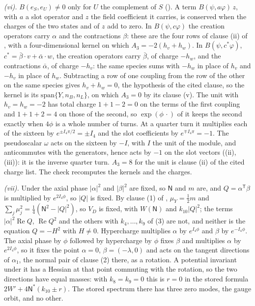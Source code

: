 \emph{(vi).} $B(e_{S}, e_{U}) \neq 0$ only for $U$ the complement of $S$ (). A term $B(\psi, a\varphi)\,z$, with $a$ a slot operator and $z$ the field coefficient it carries, is conserved when the charges of the two states and of $z$ add to zero. In $B(\psi, c\varphi)$ the creation operators carry $\alpha$ and the contractions $\beta$: these are the four rows of clause (ii) of , with a four-dimensional kernel on which $A_{3} = -2(h_{v} + h_{w})$. In $B(\psi, c^{*}\varphi)$, $c^{*} = \bar\beta\cdot v + \bar\alpha\cdot w$, the creation operators carry $\bar\beta$, of charge $-h_{w}$, and the contractions $\bar\alpha$, of charge $-h_{v}$: the same species sums with $-h_{w}$ in place of $h_{v}$ and $-h_{v}$ in place of $h_{w}$. Subtracting a row of one coupling from the row of the other on the same species gives $h_{v} + h_{w} = 0$, the hypothesis of the cited clause, so the kernel is its $\mathrm{span}\{Y, n_{B}, n_{L}\}$, on which $A_{3} = 0$ by its clause (v). The unit with $h_{v} = h_{w} = -2$ has total charge $1 + 1 - 2 = 0$ on the terms of the first coupling and $1 + 1 + 2 = 4$ on those of the second, so $\exp(\phi\,\cdot)$ of it keeps the second exactly when $4\phi$ is a whole number of turns. At a quarter turn it multiplies each of the sixteen by $e^{\pm I_{4}\pi/2} = \pm I_{4}$ and the slot coefficients by $e^{\mp I_{4}\pi} = -1$. The pseudoscalar $\omega$ acts on the sixteen by $-I$, with $I$ the unit of the module, and anticommutes with the generators, hence acts by $-1$ on the slot vectors ((ii), (iii)): it is the inverse quarter turn. $A_{3} = 8$ for the unit is clause (ii) of the cited charge list. The check recomputes the kernels and the charges.

\emph{(vii).} Under the axial phase $|\alpha|^{2}$ and $|\beta|^{2}$ are fixed, so $\mathsf{N}$ and $m$ are, and $Q = \alpha^{\mathsf T}\beta$ is multiplied by $e^{2I_{4}\phi}$, so $|Q|$ is fixed. By clause (1) of , $\mu_{Y} = \tfrac12 m$ and $\sum_{j}\mu_{j}^{2} = \tfrac14(\mathsf{N}^{2} - |Q|^{2})$, so $V_{D}$ is fixed, with $W(\mathsf{N})$ and $k_{10}|Q|^{2}$; the terms $|\alpha|^{2}\operatorname{Re}Q$, $\operatorname{Re}Q^{2}$ and the others with $k_{4}, \dots, k_{9}$ of (3) are not, and neither is the equation $Q = -H^{2}$ with $H \neq 0$. Hypercharge multiplies $\alpha$ by $e^{I_{4}\phi}$ and $\beta$ by $e^{-I_{4}\phi}$. The axial phase by $\phi$ followed by hypercharge by $\phi$ fixes $\beta$ and multiplies $\alpha$ by $e^{2I_{4}\phi}$, so it fixes the point $\alpha = 0$, $\beta = (-\lambda, 0)$ and acts on the tangent directions of $\alpha_{1}$, the normal pair of clause (2) there, as a rotation. A potential invariant under it has a Hessian at that point commuting with the rotation, so the two directions have equal masses: with $k_{8} = k_{9} = 0$ this is $r = 0$ in the stored formula $2W' + 4\mathsf{N}^{*}(k_{10} \pm r)$. The stored spectrum there has three zero modes, the gauge orbit, and no other.

